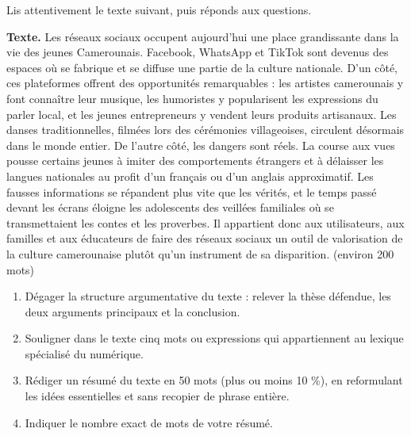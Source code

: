 \documentclass[11pt]{article}
\begin{document}
\begin{exercice}
Lis attentivement le texte suivant, puis réponds aux questions.

\textbf{Texte.} Les réseaux sociaux occupent aujourd'hui une place grandissante dans la vie des jeunes Camerounais. Facebook, WhatsApp et TikTok sont devenus des espaces où se fabrique et se diffuse une partie de la culture nationale. D'un côté, ces plateformes offrent des opportunités remarquables : les artistes camerounais y font connaître leur musique, les humoristes y popularisent les expressions du parler local, et les jeunes entrepreneurs y vendent leurs produits artisanaux. Les danses traditionnelles, filmées lors des cérémonies villageoises, circulent désormais dans le monde entier. De l'autre côté, les dangers sont réels. La course aux vues pousse certains jeunes à imiter des comportements étrangers et à délaisser les langues nationales au profit d'un français ou d'un anglais approximatif. Les fausses informations se répandent plus vite que les vérités, et le temps passé devant les écrans éloigne les adolescents des veillées familiales où se transmettaient les contes et les proverbes. Il appartient donc aux utilisateurs, aux familles et aux éducateurs de faire des réseaux sociaux un outil de valorisation de la culture camerounaise plutôt qu'un instrument de sa disparition. (environ 200 mots)

\begin{enumerate}
\item Dégager la structure argumentative du texte : relever la thèse défendue, les deux arguments principaux et la conclusion.
\item Souligner dans le texte cinq mots ou expressions qui appartiennent au lexique spécialisé du numérique.
\item Rédiger un résumé du texte en 50 mots (plus ou moins 10 \%), en reformulant les idées essentielles et sans recopier de phrase entière.
\item Indiquer le nombre exact de mots de votre résumé.
\end{enumerate}
\end{exercice}
\end{document}
